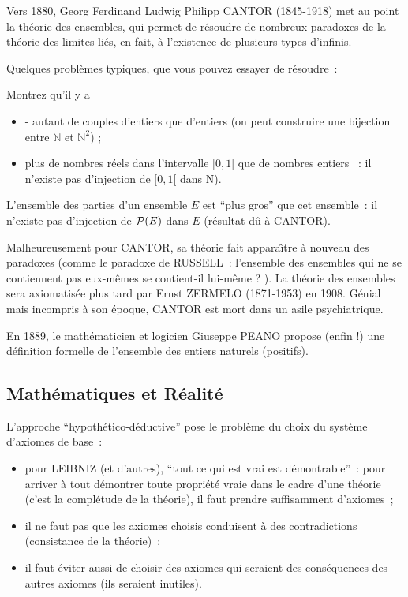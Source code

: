 Vers 1880, Georg Ferdinand Ludwig Philipp CANTOR (1845-1918) met au
point la théorie des ensembles, qui permet de résoudre de nombreux
paradoxes de la théorie des limites liés, en fait, à l'existence de
plusieurs types d'infinis.

Quelques problèmes typiques, que vous pouvez essayer de résoudre~:

\begin{exercice}
  Montrez qu'il y a
  \begin{itemize}
\item - autant de couples d'entiers que d'entiers (on peut
  construire une bijection entre $\mathbb{N}$ et $\mathbb{N}^2$) ;
  \item plus de nombres réels dans l'intervalle $[0,1[$ que de nombres
    entiers~ : il n'existe pas d'injection de $[0,1[$ dans N).
  \end{itemize}
\end{exercice}

\begin{exercice}
 L'ensemble des parties d'un ensemble $E$ est ``plus gros'' que cet
 ensemble~: il n'existe pas d'injection de ${\cal P}(E)$ dans $ E$ (résultat
 d\^u à CANTOR).
\end{exercice}



Malheureusement pour CANTOR, sa théorie fait appara\^{\i}tre à nouveau
des paradoxes (comme le paradoxe de RUSSELL~: l'ensemble des ensembles
qui ne se contiennent pas eux-m\^emes se contient-il lui-m\^eme ? ).
La théorie des ensembles sera axiomatisée plus tard par Ernst ZERMELO
(1871-1953) en 1908. Génial mais incompris à son époque, CANTOR est
mort dans un asile psychiatrique.

En 1889, le mathématicien et logicien Giuseppe PEANO propose (enfin !) 
une définition formelle de l'ensemble des entiers naturels (positifs).  


\subsection*{Mathématiques et Réalité}

L'approche ``hypothético-déductive'' pose le problème du choix du système d'axiomes de base~: 
\begin{itemize}
\item pour LEIBNIZ (et d'autres), ``tout ce qui est vrai est démontrable''~: pour arriver à tout démontrer toute propriété vraie dans le cadre d'une théorie (c'est la complétude de la théorie),  il faut prendre suffisamment d'axiomes~;
\item il ne faut pas que les axiomes choisis conduisent à des contradictions (consistance de la théorie)~;
\item il faut éviter aussi de choisir des axiomes qui seraient des conséquences des autres axiomes (ils seraient inutiles).
\end{itemize}

